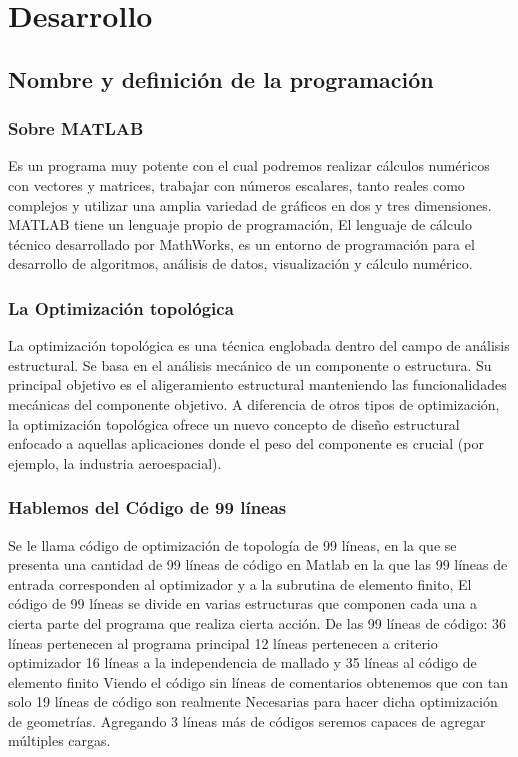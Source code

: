 \documentclass{article}
\begin{document}

\newpage
\section{Desarrollo}
\subsection{Nombre y definición de la programación}
\subsubsection{Sobre MATLAB}
Es un programa muy potente con el cual podremos realizar cálculos numéricos con vectores y matrices, trabajar con números escalares, tanto reales como complejos y utilizar una amplia variedad de gráficos en dos y tres dimensiones. MATLAB tiene un lenguaje propio de programación, El lenguaje de cálculo técnico desarrollado por MathWorks, es un entorno de programación para el desarrollo de algoritmos, análisis de datos, visualización y cálculo numérico\cite{rf1}.
\subsubsection{La Optimización topológica}
La optimización topológica es una técnica englobada dentro del campo de análisis estructural. Se basa en el análisis mecánico de un componente o estructura. Su principal objetivo es el aligeramiento estructural manteniendo las funcionalidades mecánicas del componente objetivo\cite{rf2}. A diferencia de otros tipos de optimización, la optimización topológica ofrece un nuevo concepto de diseño estructural enfocado a aquellas aplicaciones donde el peso del componente es crucial (por ejemplo, la industria aeroespacial).
\subsubsection{Hablemos del Código de 99 líneas}
Se le llama código de optimización de topología de 99 líneas, en la que se presenta una cantidad de 99 líneas de código en Matlab en la que las 99 líneas de entrada corresponden al optimizador y a la subrutina de elemento finito, El código de 99 líneas se divide en varias estructuras que componen cada una a cierta parte del programa que realiza cierta acción\cite{rf3}. De las 99 líneas de código: 36 líneas pertenecen al programa principal 12 líneas pertenecen a criterio optimizador 16 líneas a la independencia de mallado y 35 líneas al código de elemento finito Viendo el código sin líneas de comentarios obtenemos que con tan solo 19 líneas de código son realmente Necesarias para hacer dicha optimización de geometrías. Agregando 3 líneas más de códigos seremos capaces de agregar múltiples cargas.
\end{document}
